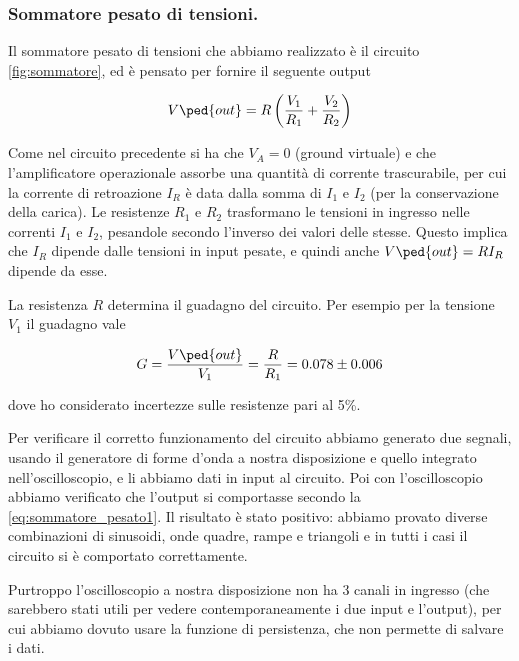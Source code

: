 \subsubsection{Sommatore pesato di tensioni.}

Il sommatore pesato di tensioni che abbiamo realizzato è il circuito \ref{fig:sommatore},
ed è pensato per fornire il seguente output

\begin{equation}
    V\ped{out} = R\left(\frac{V_1}{R_1} + \frac{V_2}{R_2}\right)
    \label{eq:sommatore_pesato1}
\end{equation}

Come nel circuito precedente si ha che $V_A = 0$ (ground virtuale) e che
l'amplificatore operazionale assorbe una quantità di corrente trascurabile,
per cui la corrente di retroazione $I_R$ è data dalla somma di $I_1$ e $I_2$
(per la conservazione della carica).
Le resistenze $R_1$ e $R_2$ trasformano le tensioni in ingresso nelle correnti
$I_1$ e $I_2$, pesandole secondo l'inverso dei valori delle stesse.
Questo implica che $I_R$ dipende dalle tensioni in input pesate,
e quindi anche $V\ped{out} = RI_R$ dipende da esse.

La resistenza $R$ determina il guadagno del circuito. Per esempio per la tensione
$V_1$ il guadagno vale

\begin{equation}
    G = \frac{V\ped{out}}{V_1} = \frac{R}{R_1} = 0.078 \pm 0.006
\end{equation}

dove ho considerato incertezze sulle resistenze pari al 5\%.

Per verificare il corretto funzionamento del circuito abbiamo generato due segnali,
usando il generatore di forme d'onda a nostra disposizione e quello integrato
nell'oscilloscopio, e li abbiamo dati in input al circuito. Poi con l'oscilloscopio
abbiamo verificato che l'output si comportasse secondo la \eqref{eq:sommatore_pesato1}.
Il risultato è stato positivo: abbiamo provato diverse combinazioni di sinusoidi,
onde quadre, rampe e triangoli e in tutti i casi il circuito si è comportato correttamente.

Purtroppo l'oscilloscopio a nostra disposizione non ha 3 canali in ingresso (che sarebbero
stati utili per vedere contemporaneamente i due input e l'output), per cui abbiamo dovuto
usare la funzione di persistenza, che non permette di salvare i dati.
